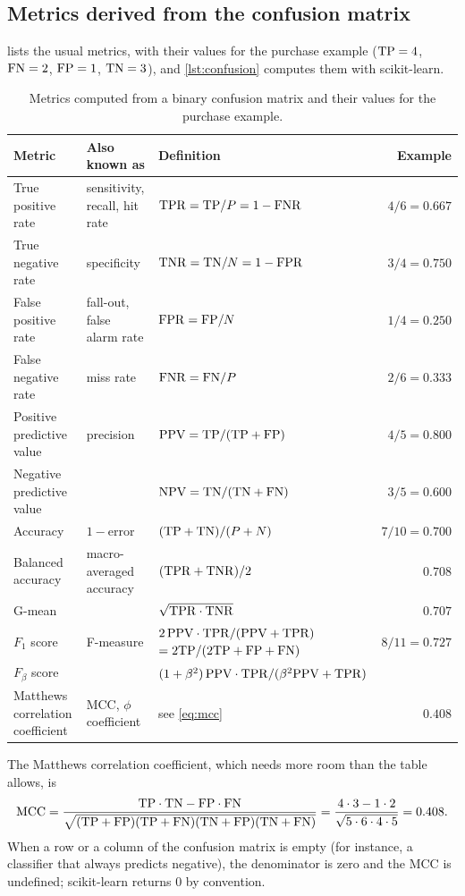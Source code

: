 \subsection{Metrics derived from the confusion matrix}

 lists the usual metrics, with their values for the purchase
example ($\mathrm{TP}=4$, $\mathrm{FN}=2$, $\mathrm{FP}=1$, $\mathrm{TN}=3$), and \cref{lst:confusion} computes them with
scikit-learn.

\begin{table}[htbp]
\centering\small
\caption{Metrics computed from a binary confusion matrix and their values for the purchase
example.}\label{tab:metrics}
\begin{tabularx}{\textwidth}{@{}>{\raggedright\arraybackslash}p{3.3cm}>{\raggedright\arraybackslash}X>{\raggedright\arraybackslash}p{4.6cm}r@{}}
\toprule
Metric & Also known as & Definition & Example\\
\midrule
True positive rate & sensitivity, recall, hit rate & $\mathrm{TPR}=\mathrm{TP}/P=1-\mathrm{FNR}$ & $4/6=0.667$\\
True negative rate & specificity & $\mathrm{TNR}=\mathrm{TN}/N=1-\mathrm{FPR}$ & $3/4=0.750$\\
False positive rate & fall-out, false alarm rate & $\mathrm{FPR}=\mathrm{FP}/N$ & $1/4=0.250$\\
False negative rate & miss rate & $\mathrm{FNR}=\mathrm{FN}/P$ & $2/6=0.333$\\
Positive predictive value & precision & $\mathrm{PPV}=\mathrm{TP}/(\mathrm{TP}+\mathrm{FP})$ & $4/5=0.800$\\
Negative predictive value & & $\mathrm{NPV}=\mathrm{TN}/(\mathrm{TN}+\mathrm{FN})$ & $3/5=0.600$\\
Accuracy & $1-$error & $(\mathrm{TP}+\mathrm{TN})/(P+N)$ & $7/10=0.700$\\
Balanced accuracy & macro-averaged accuracy & $(\mathrm{TPR}+\mathrm{TNR})/2$ & $0.708$\\
G-mean & & $\sqrt{\mathrm{TPR}\cdot\mathrm{TNR}}$ & $0.707$\\
$F_1$ score & F-measure & $2\,\mathrm{PPV}\cdot\mathrm{TPR}/(\mathrm{PPV}+\mathrm{TPR})$ $=2\mathrm{TP}/(2\mathrm{TP}+\mathrm{FP}+\mathrm{FN})$ & $8/11=0.727$\\
$F_\beta$ score & & $(1+\beta^2)\,\mathrm{PPV}\cdot\mathrm{TPR}/(\beta^2\mathrm{PPV}+\mathrm{TPR})$ & \\
Matthews correlation coefficient & MCC, $\phi$ coefficient & see \cref{eq:mcc} & $0.408$\\
\bottomrule
\end{tabularx}
\end{table}

The Matthews correlation coefficient, which needs more room than the table allows, is
\begin{equation}\label{eq:mcc}
  \mathrm{MCC}=\frac{\mathrm{TP}\cdot\mathrm{TN}-\mathrm{FP}\cdot\mathrm{FN}}{\sqrt{(\mathrm{TP}+\mathrm{FP})(\mathrm{TP}+\mathrm{FN})(\mathrm{TN}+\mathrm{FP})(\mathrm{TN}+\mathrm{FN})}}
  =\frac{4\cdot3-1\cdot2}{\sqrt{5\cdot6\cdot4\cdot5}}=0.408 .
\end{equation}
When a row or a column of the confusion matrix is empty (for instance, a classifier that always
predicts negative), the denominator is zero and the MCC is undefined; \textsf{scikit-learn} returns 0 by
convention.

